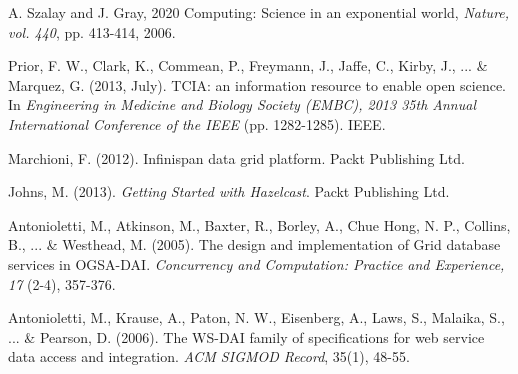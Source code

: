 \documentclass[letterpaper, 10 pt, conference]{ieeeconf}  %
\begin{document}
\begin{thebibliography}{99}
	\scriptsize{
		
		 A. Szalay and J. Gray, 2020 Computing: Science in an exponential world, {\em Nature, vol. 440}, pp. 413-414, 2006.
		
		 Prior, F. W., Clark, K., Commean, P., Freymann, J., Jaffe, C., Kirby, J., ... \& Marquez, G. (2013, July). TCIA: an information resource to enable open science. In {\em Engineering in Medicine and Biology Society (EMBC), 2013 35th Annual International Conference of the IEEE} (pp. 1282-1285). IEEE.
				
		 Marchioni, F. (2012). Infinispan data grid platform. Packt Publishing Ltd.
				
		 Johns, M. (2013). {\em Getting Started with Hazelcast}. Packt Publishing Ltd.
		
		 Antonioletti, M., Atkinson, M., Baxter, R., Borley, A., Chue Hong, N. P., Collins, B., ... \& Westhead, M. (2005). The design and implementation of Grid database services in OGSA-DAI. {\em  Concurrency and Computation: Practice and Experience, 17} (2-4), 357-376.
		
		 Antonioletti, M., Krause, A., Paton, N. W., Eisenberg, A., Laws, S., Malaika, S., ... \& Pearson, D. (2006). The WS-DAI family of specifications for web service data access and integration. {\em ACM SIGMOD Record}, 35(1), 48-55.
		
	}
\end{thebibliography}
\end{document}
